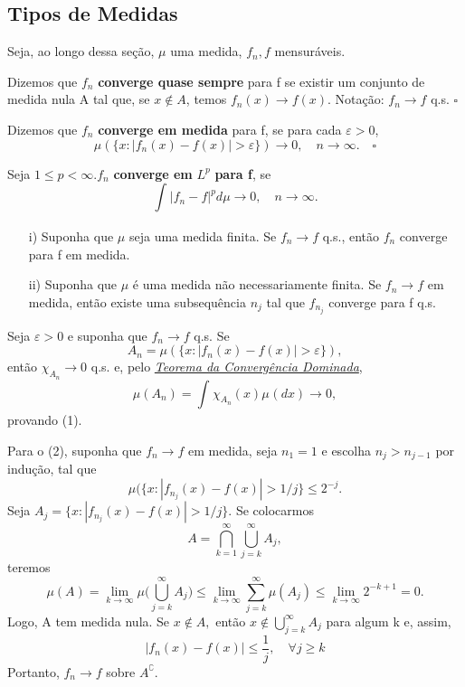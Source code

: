 \documentclass[measure_theory.tex]{subfiles}
\begin{document}
\subsection{Tipos de Medidas}
Seja, ao longo dessa seção, \(\mu \) uma medida, \(f_{n}, f\) mensuráveis.
\begin{def*}
	Dizemos que \(f_{n}\) \textbf{converge quase sempre} para f se existir um conjunto de medida nula A tal que, se \(x\not\in A\), temos \(f_{n}(x)\to f(x).\) Notação: \(f_{n}\to f\) q.s. \(\square\)
\end{def*}
\begin{def*}
	Dizemos que \(f_{n}\) \textbf{converge em medida} para f, se para cada \(\varepsilon  > 0\),
	\[
		\mu (\{x: |f_{n}(x) - f(x)| > \varepsilon \})\to 0,\quad n\to \infty.\quad \square
	\]
\end{def*}
\begin{def*}
	Seja \(1\leq p < \infty. f_{n}\)\textbf{ converge em }\(L^{p}\)\textbf{ para f}, se
	\[
		\int_{}|f_{n} - f|^{p} d\mu\to 0,\quad n\to \infty.
	\]
\end{def*}
\begin{prop*}
	\begin{itemize}
		\item[i)]Suponha que \(\mu \) seja uma medida finita. Se \(f_{n}\to f\) q.s., então \(f_{n}\) converge para f em medida.
		\item[ii)] Suponha que \(\mu \) é uma medida não necessariamente finita. Se \(f_{n}\to f\) em medida, então existe uma subsequência \(n_{j}\) tal que \(f_{n_{j}}\) converge para f q.s.
	\end{itemize}
\end{prop*}
\begin{proof*}
	Seja \(\varepsilon > 0\) e suponha que \(f_{n}\to f\) q.s. Se
	\[
		A_{n} = \mu (\{x: |f_{n}(x) - f(x)| > \varepsilon \}),
	\]
	então \(\chi_{A_{n}}\to 0\) q.s. e, pelo \hyperlink{dominated_convergence}{\textit{Teorema da Convergência Dominada}},
	\[
		\mu (A_{n}) = \int_{}\chi_{A_{n}}(x) \mu_{}(dx)\to 0,
	\]
	provando (1).

	Para o (2), suponha que \(f_{n}\to f\) em medida, seja \(n_1 = 1\) e escolha \(n_{j} > n_{j-1}\) por indução, tal que
	\[
		\mu (\{x: |f_{n_{j}}(x) - f(x)| > 1/j\} \leq 2^{-j}.
	\]
	Seja \(A_{j} = \{x: |f_{n_{j}}(x) - f(x)| > 1/j\}.\) Se colocarmos
	\[
		A = \bigcap_{k=1}^{\infty}\bigcup_{j=k}^{\infty}A_{j},
	\]
	teremos
	\[
		\mu (A) = \lim_{k\to \infty}\mu \biggl(\bigcup_{j=k}^{\infty}A_{j}\biggr) \leq \lim_{k\to \infty}\sum\limits_{j=k}^{\infty}\mu (A_{j}) \leq \lim_{k\to \infty}2^{-k+1} = 0.
	\]
	Logo, A tem medida nula. Se \(x\not\in A,\) então \(x\not\in \bigcup_{j=k}^{\infty}A_{j}\) para algum k e, assim,
	\[
		|f_{n}(x)-f(x)|\leq \frac{1}{j},\quad \forall j\geq k
	\]
	Portanto, \(f_{n}\to f\) sobre \(A ^{\complement}\). \qedsymbol
\end{proof*}
\end{document}
